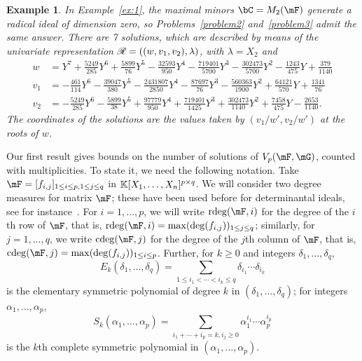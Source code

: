 \documentclass[12pt]{article}
\newtheorem{example}[definition]{Example}
\begin{document}
\begin{example}\label{ex:2}
  In Example~\ref{ex:1}, the maximal minors $\bC = M_2(\mF)$ generate a radical
  ideal of dimension zero, so Problems~\ref{problem2} and~\ref{problem3} admit the same
  answer. There are 7 solutions, which are described by means of the univariate
  representation $\mathscr{R}=((w,v_1,v_2),\lambda)$, with $\lambda = X_2$ and
{\small  \begin{align*}
w &= Y^7 + \frac{5249}{285}Y^6 + \frac{5899}{76}Y^5 - \frac{32593}{950}Y^4 - \frac{719401}{5700}Y^3 
        - \frac{302473}{5700}Y^2 - \frac{1243}{475}Y + \frac{379}{1140}\\[1mm]
v_1&= -\frac{461}{114}Y^6 - \frac{39047}{380}Y^5 - \frac{2431807}{2850}Y^4 - \frac{87697}{76}Y^3 - \frac{560363}{1900}Y^2 
      + \frac{64121}{570}Y + \frac{1341}{76}\\[1mm]
v_2 &= -\frac{5249}{285}Y^6 - \frac{5899}{38}Y^5 + \frac{97779}{950}Y^4 + \frac{719401}{1425}Y^3 
       + \frac{302473}{1140}Y^2 + \frac{7458}{475}Y - \frac{2653}{1140}.
  \end{align*}}
  The coordinates of the solutions are the values taken by $(v_1/w',v_2/w')$
  at the roots of $w$. 
\end{example}


Our first result gives bounds on the number of solutions of
$\VpFG{p}{\mF}{\mG}$, counted with multiplicities. To state it, we
need the following notation.  Take $\mF=[f_{i,j}]_{1 \le i \le p, 1
  \le j \le q}$ in $\mathbb{K}[X_1,\dots,X_n]^{p \times q}$.  We will
consider two degree measures for matrix $\mF$; these have been used
before for determinantal ideals, see for
instance~\cite{NieRan09,MiSt04}. For $i=1,\dots,p$, we will write
$\rdeg(\mF,i)$ for the degree of the $i$th row of $\mF$, that is,
$\rdeg(\mF,i)=\max(\deg(f_{i,j}))_{1 \le j \le q}$; similarly, for
$j=1,\dots,q$, we write $\cdeg(\mF,j)$ for the degree of the $j$th
column of $\mF$, that is, $\cdeg(\mF,j)=\max(\deg(f_{i,j}))_{1 \le i
  \le p}$. Further, for $k \ge 0$ and integers $\delta_1,\dots,\delta_q$,
$$E_k(\delta_1,\dots,\delta_q)=\sum_{1\leq i_1 < \cdots < i_k \leq
  q}\delta_{i_1} \cdots \delta_{i_k}$$ is the elementary symmetric
polynomial of degree $k$ in $(\delta_1, \ldots, \delta_q)$; 
for integers $\alpha_1,\dots,\alpha_p$,
$$S_k(\alpha_1,\dots,\alpha_p) = \sum_{i_1+\cdots+i_p=k, i_j \geq
  0}\alpha_1^{i_1}\cdots\alpha_p^{i_p}$$ is the $k$th complete
symmetric polynomial in $(\alpha_1,\dots,\alpha_p)$.
\end{document}
